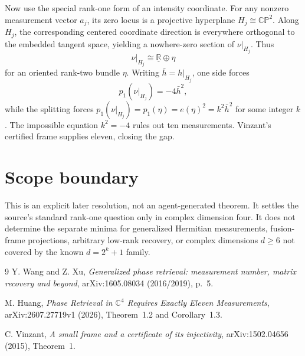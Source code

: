 \documentclass[11pt]{article}
\begin{document}
Now use the special rank-one form of an intensity coordinate.  For any nonzero measurement vector $a_j$, its zero locus is a projective hyperplane $H_j\cong\mathbb{CP}^2$.  Along $H_j$, the corresponding centered coordinate direction is everywhere orthogonal to the embedded tangent space, yielding a nowhere-zero section of $\nu|_{H_j}$.  Thus
\[
 \nu|_{H_j}\cong\underline{\mathbb R}\oplus\eta
\]
for an oriented rank-two bundle $\eta$.  Writing $\bar h=h|_{H_j}$, one side forces
\[
 p_1(\nu|_{H_j})=-4\bar h^2,
\]
while the splitting forces $p_1(\nu|_{H_j})=p_1(\eta)=e(\eta)^2=k^2\bar h^2$ for some integer $k$.  The impossible equation $k^2=-4$ rules out ten measurements.  Vinzant's certified frame supplies eleven, closing the gap.

\section*{Scope boundary}
This is an explicit later resolution, not an agent-generated theorem.  It settles the source's standard rank-one question only in complex dimension four.  It does not determine the separate minima for generalized Hermitian measurements, fusion-frame projections, arbitrary low-rank recovery, or complex dimensions $d\ge6$ not covered by the known $d=2^k+1$ family.

{\raggedright
\begin{thebibliography}{9}
Y. Wang and Z. Xu,
\emph{Generalized phase retrieval: measurement number, matrix recovery and beyond},
arXiv:1605.08034 (2016/2019), p.~5.

M. Huang,
\emph{Phase Retrieval in $\mathbb C^4$ Requires Exactly Eleven Measurements},
arXiv:2607.27719v1 (2026), Theorem~1.2 and Corollary~1.3.

C. Vinzant,
\emph{A small frame and a certificate of its injectivity},
arXiv:1502.04656 (2015), Theorem~1.
\end{thebibliography}
\par}
\end{document}
